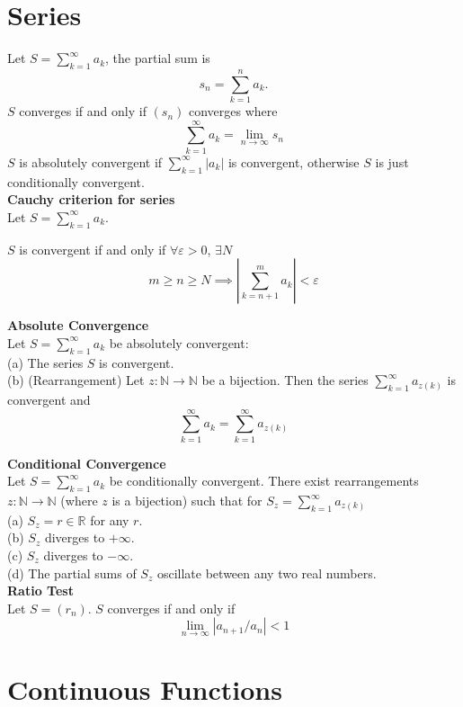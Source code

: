 \documentclass[a4paper, 10pt]{article}
\begin{document}
\begin{multicols*}{3}
\section*{Series}

Let $S=\sum_{k=1}^{\infty} a_k$, the partial sum is 
$$
s_n=\sum_{k=1}^n a_k .
$$
$S$ converges if and only if $\left(s_n\right)$ converges where
$$
\sum_{k=1}^{\infty} a_k=\lim_{n\rightarrow\infty}s_n
$$
$S$ is absolutely convergent if $\sum_{k=1}^{\infty}\left|a_k\right|$ is convergent, otherwise $S$ is just conditionally convergent.\\

\textbf{Cauchy criterion for series}\\
Let $S=\sum_{k=1}^{\infty} a_k$. 

$S$ is convergent if and only if $\forall\varepsilon>0$, $\exists N$ 
$$
m \geq n \geq N \implies \left|\sum_{k=n+1}^m a_k\right|<\varepsilon
$$

\textbf{Absolute Convergence} \\
Let $S=\sum_{k=1}^{\infty} a_k$ be absolutely convergent:\\ 
(a) The series $S$ is convergent.\\
(b) (Rearrangement) Let $z: \mathbb{N} \rightarrow \mathbb{N}$ be a bijection. Then the series $\sum_{k=1}^{\infty} a_{z(k)}$ is convergent and
$$
\sum_{k=1}^{\infty} a_k=\sum_{k=1}^{\infty} a_{z(k)}
$$

\textbf{Conditional Convergence} \\
Let $S=\sum_{k=1}^{\infty} a_k$ be conditionally convergent. There exist rearrangements $z: \mathbb{N} \rightarrow \mathbb{N}$ (where $z$ is a bijection) such that for $S_z= \sum_{k=1}^{\infty} a_{z(k)}$\\
(a) $S_z=r \in \mathbb{R}$ for any $r$. \\
(b) $S_z$ diverges to $+\infty$.\\
(c) $S_z$ diverges to $-\infty$.\\
(d) The partial sums of $S_z$ oscillate between any two real numbers.\\

\textbf{Ratio Test}\\
Let $S=\left(r_n\right)$. $S$ converges if and only if
$$\lim _{n \rightarrow \infty}\left|a_{n+1} / a_n\right|<1$$

\section*{Continuous Functions}


\end{multicols*}
\end{document}
